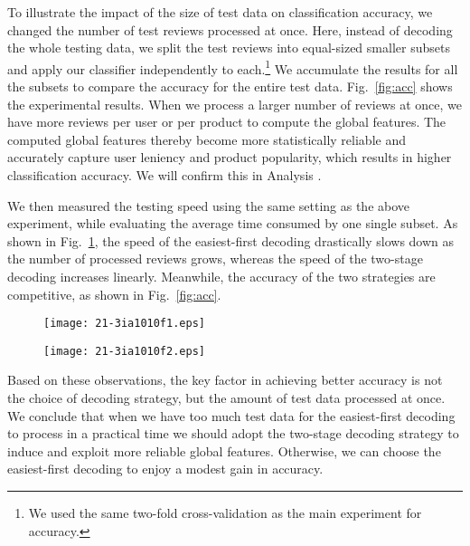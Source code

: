 \documentclass[english]{jnlp_1.4}
\begin{document}
To illustrate the impact of the size of test data on classification accuracy, we changed the number of test reviews processed at once.  
Here, instead of decoding the whole testing data, we split the test reviews into equal-sized smaller subsets and apply our classifier independently to each.\footnote{We used the same two-fold cross-validation as the main experiment for accuracy.} 
We accumulate the results for all the subsets to compare the accuracy for the entire test data.
Fig.~\ref{fig:acc} shows the experimental results. 
When we process a larger number of reviews at once, we have more reviews per user or per product to compute the global features. 
The computed global features thereby become more statistically reliable and accurately capture user leniency and product popularity, which results in higher classification accuracy. 
We will confirm this in Analysis {}.
 
We then measured the testing speed using the same setting as the above experiment, while evaluating the average time consumed by one single subset. 
As shown in Fig.~\ref{fig:speed}, the speed of the easiest-first decoding  drastically slows down as the number of processed reviews grows, whereas the speed of the two-stage decoding increases linearly.
Meanwhile, the accuracy of the two strategies are competitive, as shown in Fig.~\ref{fig:acc}.  

\begin{figure}[t]
\setlength{\captionwidth}{200pt}
	\begin{minipage}[t]{200pt}
\begin{center}
	\texttt{[image: 21-3ia1010f1.eps]}
\end{center}
	\label{fig:acc}
	\end{minipage}
	\hfill
	\begin{minipage}[t]{200pt}
\begin{center}
	\texttt{[image: 21-3ia1010f2.eps]}
\end{center}
	\label{fig:speed}
	\end{minipage}
\end{figure}

Based on these observations, the key factor in achieving better accuracy is not the choice of decoding strategy, but the amount of test data processed at once. 
We conclude that when we have too much test data for the easiest-first decoding to process in a practical time we should adopt the two-stage decoding strategy to induce and exploit more reliable global features. 
Otherwise, we can choose the easiest-first decoding to enjoy a modest gain in accuracy.
\end{document}
